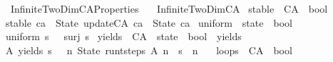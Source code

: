 %
\begin{isabellebody}%
%
%
\isadelimdocument
%
\endisadelimdocument
%
\isatagdocument
%
\isamarkuptrue%
%
\endisatagdocument
{\isafolddocument}%
%
\isadelimdocument
%
\endisadelimdocument
%
\isadelimtheory
%
\endisadelimtheory
%
\isatagtheory
{}\isamarkupfalse%
\ Infinite{\isacharunderscore}TwoDim{\isacharunderscore}CA{\isacharunderscore}Properties\isanewline
\ \ \ Infinite{\isacharunderscore}TwoDim{\isacharunderscore}CA\isanewline
{}%
\endisatagtheory
{\isafoldtheory}%
%
\isadelimtheory
%
\endisadelimtheory
%
\isadelimdocument
%
\endisadelimdocument
%
\isatagdocument
%
\isamarkuptrue%
%
\endisatagdocument
{\isafolddocument}%
%
\isadelimdocument
%
\endisadelimdocument
{}\isamarkupfalse%
\ stable\ {\isacharcolon}{\isacharcolon}\ {\isachardoublequoteopen}CA\ {\isasymRightarrow}\ bool{\isachardoublequoteclose}\ \isanewline
{\isachardoublequoteopen}stable\ ca\ {\isasymequiv}\ State\ {\isacharparenleft}update{\isacharunderscore}CA\ ca{\isacharparenright}\ {\isacharequal}\ State\ ca{\isachardoublequoteclose}\isanewline
\isanewline
\isanewline
{}\isamarkupfalse%
\ uniform\ {\isacharcolon}{\isacharcolon}\ {\isachardoublequoteopen}state\ {\isasymRightarrow}\ bool{\isachardoublequoteclose}\ \isanewline
{\isachardoublequoteopen}uniform\ s\ {\isasymequiv}\ {\isasymnot}\ {\isacharparenleft}surj\ s{\isacharparenright}{\isachardoublequoteclose}\isanewline
\isanewline
{}\isamarkupfalse%
\ yields\ {\isacharcolon}{\isacharcolon}\ {\isachardoublequoteopen}CA\ {\isasymRightarrow}\ state\ {\isasymRightarrow}\ bool{\isachardoublequoteclose}\ {\isacharparenleft}\ {\isacartoucheopen}yields{\isacartoucheclose}\ \ {}{}{\isacharparenright}\ \isanewline
{\isachardoublequoteopen}A\ yields\ s\ {\isasymequiv}\ {\isacharparenleft}{\isasymexists}\ n{\isachardot}\ State\ {\isacharparenleft}run{\isacharunderscore}t{\isacharunderscore}steps\ A\ n{\isacharparenright}\ {\isacharequal}\ s\ {\isasymand}\ n\ {\isachargreater}\ {}{\isacharparenright}{\isachardoublequoteclose}\isanewline
\isanewline
{}\isamarkupfalse%
\ loops\ {\isacharcolon}{\isacharcolon}\ {\isachardoublequoteopen}CA\ {\isasymRightarrow}\ bool{\isachardoublequoteclose}\ \isanewline

\end{isabellebody}
